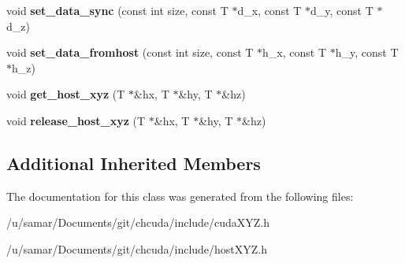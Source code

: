 \begin{DoxyCompactItemize}
\item 
\hypertarget{classhostXYZ_ac4f8f8c54df48574db452735886f8592}{}\label{classhostXYZ_ac4f8f8c54df48574db452735886f8592} 
void {\bfseries set\+\_\+data\+\_\+sync} (const int size, const T $\ast$d\+\_\+x, const T $\ast$d\+\_\+y, const T $\ast$d\+\_\+z)
\item 
\hypertarget{classhostXYZ_aa08825ac00e48ef6b170be03cfe4fcd1}{}\label{classhostXYZ_aa08825ac00e48ef6b170be03cfe4fcd1} 
void {\bfseries set\+\_\+data\+\_\+fromhost} (const int size, const T $\ast$h\+\_\+x, const T $\ast$h\+\_\+y, const T $\ast$h\+\_\+z)
\item 
\hypertarget{classhostXYZ_a91c22d6ee28e2db05a3d9884a9e0bd8b}{}\label{classhostXYZ_a91c22d6ee28e2db05a3d9884a9e0bd8b} 
void {\bfseries get\+\_\+host\+\_\+xyz} (T $\ast$\&hx, T $\ast$\&hy, T $\ast$\&hz)
\item 
\hypertarget{classhostXYZ_afab68d59cabec83d9cbed04614ae718b}{}\label{classhostXYZ_afab68d59cabec83d9cbed04614ae718b} 
void {\bfseries release\+\_\+host\+\_\+xyz} (T $\ast$\&hx, T $\ast$\&hy, T $\ast$\&hz)
\end{DoxyCompactItemize}
\subsection*{Additional Inherited Members}


The documentation for this class was generated from the following files\+:\begin{DoxyCompactItemize}
\item 
/u/samar/\+Documents/git/chcuda/include/cuda\+X\+Y\+Z.\+h\item 
/u/samar/\+Documents/git/chcuda/include/host\+X\+Y\+Z.\+h\end{DoxyCompactItemize}
